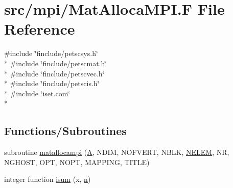 \hypertarget{mpi_2_mat_alloca_m_p_i_8_f}{\section{src/mpi/\-Mat\-Alloca\-M\-P\-I.F File Reference}
\label{mpi_2_mat_alloca_m_p_i_8_f}
}
{\ttfamily \#include \char`\"{}finclude/petscsys.\-h\char`\"{}}\\*
{\ttfamily \#include \char`\"{}finclude/petscmat.\-h\char`\"{}}\\*
{\ttfamily \#include \char`\"{}finclude/petscvec.\-h\char`\"{}}\\*
{\ttfamily \#include \char`\"{}finclude/petscis.\-h\char`\"{}}\\*
{\ttfamily \#include \char`\"{}iset.\-com\char`\"{}}\\*
\subsection*{Functions/\-Subroutines}
\begin{DoxyCompactItemize}
\item 
subroutine \hyperlink{mpi_2_mat_alloca_m_p_i_8_f_ab05c3db5e1682afcf4ea5fb6d0b2bbdf}{matallocampi} (\hyperlink{ibc2_8com_ad2108d58343608772fff791c23da58f5}{A}, N\-D\-I\-M, N\-O\-F\-V\-E\-R\-T, N\-B\-L\-K, \hyperlink{mesh_8com_aee5e75b79d0e815c0603cfbccc618957}{N\-E\-L\-E\-M}, N\-R, N\-G\-H\-O\-S\-T, O\-P\-T, N\-O\-P\-T, M\-A\-P\-P\-I\-N\-G, T\-I\-T\-L\-E)
\item 
integer function \hyperlink{mpi_2_mat_alloca_m_p_i_8_f_a02f30f3c61aa8e65498203cd9dcdb315}{isum} (x, \hyperlink{time_8com_a24bdc4a048267ff98f6f8137112e6f2f}{n})
\end{DoxyCompactItemize}



